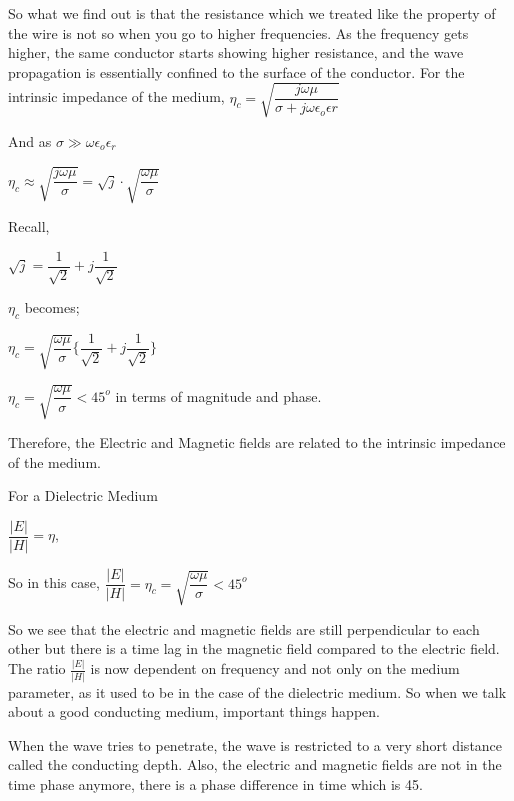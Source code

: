 So what we find out is that the resistance which we treated like the property of the wire is not so when you go to higher frequencies. As the frequency gets higher, the same conductor starts showing higher resistance, and the wave propagation is essentially confined to the surface of the conductor.
For the intrinsic impedance of the medium, $\eta_{c}=\sqrt{\dfrac{j\omega\mu}{\sigma+j\omega\epsilon_{o}\epsilon{r}}}$

And as $\sigma\gg\omega\epsilon_{o}\epsilon_{r}$
\begin{center}
$\eta_{c}\approx\sqrt{\dfrac{j\omega\mu}{\sigma}}=\sqrt{j}\cdot\sqrt{\dfrac{\omega\mu}{\sigma}}$
\end{center}

Recall,
\begin{center}
$\sqrt{j}=\dfrac{1}{\sqrt{2}}+j\dfrac{1}{\sqrt{2}}$
\end{center}

$\eta_{c}$ becomes;
\begin{center}
$\eta_{c}=\sqrt{\dfrac{\omega\mu}{\sigma}}\Bigg\{\dfrac{1}{\sqrt{2}}+j\dfrac{1}{\sqrt{2}}\Bigg\}$
\end{center} 

\begin{center}
$\eta_{c}=\sqrt{\dfrac{\omega\mu}{\sigma}}<45^{o}$ in terms of magnitude and phase.
\end{center}

Therefore, the Electric and Magnetic fields are related to the intrinsic impedance of the medium.

For a Dielectric Medium
\begin{center}
$\dfrac{|E|}{|H|}=\eta,$
\end{center}

So in this case, $\dfrac{|E|}{|H|}=\eta_{c}=\sqrt{\dfrac{\omega\mu}{\sigma}}<45^{o}$

So we see that the electric and magnetic fields are still perpendicular to each other but there is a time lag in the magnetic field compared to the electric field. The ratio $\frac{|E|}{|H|}$ is now dependent on frequency and not only on the medium parameter, as it used to be in the case of the dielectric medium. So when we talk about a good conducting medium, important things happen.

When the wave tries to penetrate, the wave is restricted to a very short distance called the conducting depth. Also, the electric and magnetic fields are not in the time phase anymore, there is a phase difference in time which is 45\textdegree.

